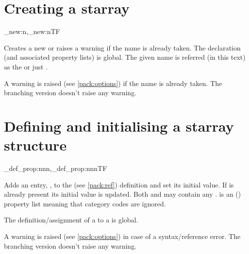 \documentclass[10pt]{article}
\begin{document}
\section{Creating a starray}\label{pack:new}
\begin{codedescribe}{\starray_new:n,\starray_new:nTF}
\begin{codesyntax}%
\end{codesyntax}
\end{codedescribe}

Creates a new  or raises a warning  if the name is already taken. The declaration (and associated property lists) is global. The given name is referred (in this text) as the  or just . 
\begin{tsremark}
  A warning is raised (see \ref{pack:options}) if the name is already taken. The branching version doesn't raise any warning.
\end{tsremark}

\section{Defining and initialising a starray structure}\label{pack:def}

\begin{codedescribe}{\starray_def_prop:nnn,\starray_def_prop:nnnTF}
\begin{codesyntax}%
\end{codesyntax}
Adds an entry, , to the  (see \ref{pack:ref}) definition and set its initial value. If  is already present its initial value is updated. Both  and  may contain any .  is an () property list  meaning that category codes are ignored.

The definition/assignment of a  to a  is global.
\end{codedescribe}

\begin{tsremark}
A warning is raised (see \ref{pack:options}) in case of a  syntax/reference error. The branching version doesn't raise any warning.
\end{tsremark}
\end{document}
